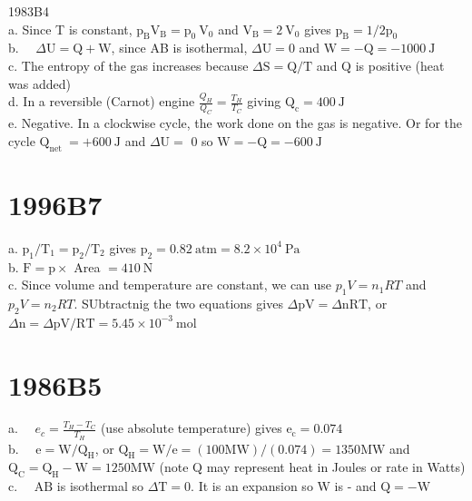 \begin{enumerate}
1983B4\\
a. Since T is constant, $\mathrm{p}_{\mathrm{B}} \mathrm{V}_{\mathrm{B}}=\mathrm{p}_{0} \mathrm{~V}_{0}$ and $\mathrm{V}_{\mathrm{B}}=2 \mathrm{~V}_{0}$ gives $\mathrm{p}_{\mathrm{B}}=1 / 2 \mathrm{p}_{0}$\\
b. $\quad \Delta \mathrm{U}=\mathrm{Q}+\mathrm{W}$, since AB is isothermal, $\Delta \mathrm{U}=0$ and $\mathrm{W}=-\mathrm{Q}=-1000 \mathrm{~J}$\\
c. The entropy of the gas increases because $\Delta \mathrm{S}=\mathrm{Q} / \mathrm{T}$ and Q is positive (heat was added)\\
d. In a reversible (Carnot) engine $\frac{Q_{H}}{Q_{C}}=\frac{T_{H}}{T_{C}}$ giving $\mathrm{Q}_{\mathrm{c}}=400 \mathrm{~J}$\\
e. Negative. In a clockwise cycle, the work done on the gas is negative. Or for the cycle $\mathrm{Q}_{\text {net }}=+600 \mathrm{~J}$ and $\Delta \mathrm{U}=$ 0 so $\mathrm{W}=-\mathrm{Q}=-600 \mathrm{~J}$

\section*{1996B7}
a. $\mathrm{p}_{1} / \mathrm{T}_{1}=\mathrm{p}_{2} / \mathrm{T}_{2}$ gives $\mathrm{p}_{2}=0.82 \mathrm{~atm}=8.2 \times 10^{4} \mathrm{~Pa}$\\
b. $\mathrm{F}=\mathrm{p} \times$ Area $=410 \mathrm{~N}$\\
c. Since volume and temperature are constant, we can use $p_{1} V=n_{1} R T$ and $p_{2} V=n_{2} R T$. SUbtractnig the two equations gives $\Delta \mathrm{pV}=\Delta \mathrm{nRT}$, or $\Delta \mathrm{n}=\Delta \mathrm{pV} / \mathrm{RT}=5.45 \times 10^{-3} \mathrm{~mol}$

\section*{1986B5}
a. $\quad e_{c}=\frac{T_{H}-T_{C}}{T_{H}}$ (use absolute temperature) gives $\mathrm{e}_{\mathrm{c}}=0.074$\\
b. $\quad \mathrm{e}=\mathrm{W} / \mathrm{Q}_{\mathrm{H}}$, or $\mathrm{Q}_{\mathrm{H}}=\mathrm{W} / \mathrm{e}=(100 \mathrm{MW}) /(0.074)=1350 \mathrm{MW}$ and $\mathrm{Q}_{\mathrm{C}}=\mathrm{Q}_{\mathrm{H}}-\mathrm{W}=1250 \mathrm{MW}$ (note Q may represent heat in Joules or rate in Watts)\\
c. $\quad \mathrm{AB}$ is isothermal so $\Delta \mathrm{T}=0$. It is an expansion so W is - and $\mathrm{Q}=-\mathrm{W}$


\end{enumerate}
